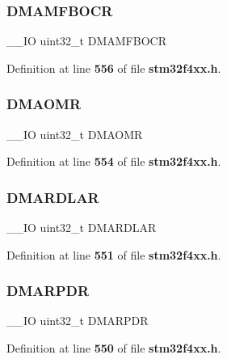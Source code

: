 \subsubsection{D\+M\+A\+M\+F\+B\+O\+CR}
{\footnotesize\ttfamily \+\_\+\+\_\+\+IO uint32\+\_\+t D\+M\+A\+M\+F\+B\+O\+CR}



Definition at line \textbf{ 556} of file \textbf{ stm32f4xx.\+h}.

\mbox{\label{structETH__TypeDef_aa15b972f30ee47f5df0d3ebc8866509d}} 
\subsubsection{D\+M\+A\+O\+MR}
{\footnotesize\ttfamily \+\_\+\+\_\+\+IO uint32\+\_\+t D\+M\+A\+O\+MR}



Definition at line \textbf{ 554} of file \textbf{ stm32f4xx.\+h}.

\mbox{\label{structETH__TypeDef_a581ce491c035ce46db723260377c2032}} 
\subsubsection{D\+M\+A\+R\+D\+L\+AR}
{\footnotesize\ttfamily \+\_\+\+\_\+\+IO uint32\+\_\+t D\+M\+A\+R\+D\+L\+AR}



Definition at line \textbf{ 551} of file \textbf{ stm32f4xx.\+h}.

\mbox{\label{structETH__TypeDef_aad6309afe126da26921191697d7e5c43}} 
\subsubsection{D\+M\+A\+R\+P\+DR}
{\footnotesize\ttfamily \+\_\+\+\_\+\+IO uint32\+\_\+t D\+M\+A\+R\+P\+DR}



Definition at line \textbf{ 550} of file \textbf{ stm32f4xx.\+h}.

